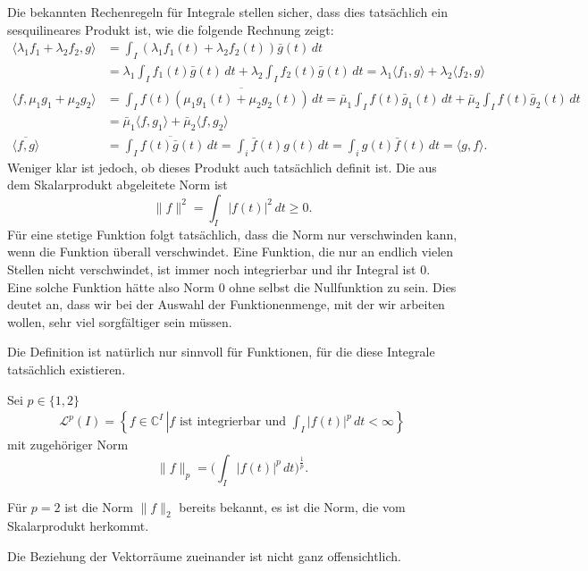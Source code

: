 Die bekannten Rechenregeln für Integrale stellen sicher, dass dies
tatsächlich ein sesquilineares Produkt ist, wie die folgende Rechnung
zeigt:
\begin{align*}
\langle \lambda_1 f_1+\lambda_2 f_2,g\rangle
&=
\int_I (\lambda_1 f_1(t) + \lambda_2 f_2(t))\bar{g}(t)\,dt
\\
&=
\lambda_1 \int_I f_1(t) \bar{g}(t)\,dt + \lambda_2 \int_I f_2(t)\bar{g}(t)\,dt
= \lambda_1 \langle f_1,g\rangle + \lambda_2 \langle f_2,g\rangle
\\
\langle f,\mu_1 g_1 + \mu_2 g_2\rangle
&=
\int_I f(t) \overline{(\mu_1 g_1(t) + \mu_2 g_2(t))}\,dt
=
\bar{\mu}_1 \int_I f(t) \bar{g}_1(t)\,dt
+
\bar{\mu}_2 \int_I f(t) \bar{g}_2(t)\,dt
\\
&=
\bar{\mu}_1 \langle f,g_1\rangle
+
\bar{\mu}_2 \langle f,g_2\rangle
\\
\overline{
\langle f,g\rangle
}
&=
\overline{ \int_I f(t)\bar{g}(t)\,dt}
=
\int_i \bar{f}(t) g(t)\,dt
=
\int_i g(t) \bar{f}(t)\,dt
=
\langle g,f\rangle.
\end{align*}
Weniger klar ist jedoch, ob dieses Produkt auch tatsächlich definit ist.
Die aus dem Skalarprodukt abgeleitete Norm ist
\[
\|f\|^2 = \int_I |f(t)|^2\,dt \ge 0.
\]
Für eine stetige Funktion folgt tatsächlich, dass die Norm nur
verschwinden kann, wenn die Funktion überall verschwindet.
Eine Funktion, die nur an endlich vielen Stellen nicht verschwindet,
ist immer noch integrierbar und ihr Integral ist $0$.
Eine solche Funktion hätte also Norm $0$ ohne selbst die Nullfunktion zu
sein.
Dies deutet an, dass wir bei der Auswahl der Funktionenmenge, mit der
wir arbeiten wollen, sehr viel sorgfältiger sein müssen.

Die Definition ist natürlich nur sinnvoll für Funktionen, für die diese
Integrale tatsächlich existieren.
\begin{definition}
Sei $p\in \{1,2\}$ 
\begin{align*}
\mathcal{L}^p(I)
=
\left\{ f \in \mathbb C^I \, \left|
\text{
$f$ ist integrierbar und $\int_I |f(t)|^p\,dt<\infty$
}
\right.\right\}
\end{align*}
mit zugehöriger Norm
\[
\|f\|_p = \biggl(\int_I |f(t)|^p \,dt\biggr)^{\frac1p}.
\]
\end{definition}

Für $p=2$ ist die Norm $\|f\|_2$ bereits bekannt, es ist die Norm, die
vom Skalarprodukt herkommt.

Die Beziehung der Vektorräume zueinander ist nicht ganz offensichtlich.

